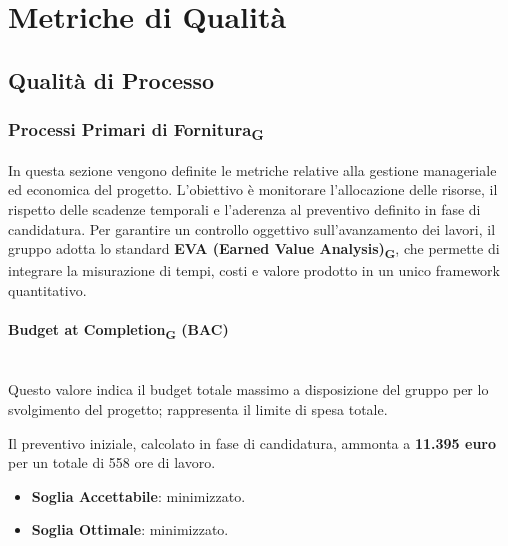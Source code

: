 \documentclass[11pt,a4paper]{article}
\begin{document}
\newpage

\section{Metriche di Qualità}
\subsection{Qualità di Processo}

\subsubsection{Processi Primari di Fornitura\textsubscript{G}}
In questa sezione vengono definite le metriche relative alla gestione manageriale ed economica del progetto. L'obiettivo è monitorare l'allocazione delle risorse, il rispetto delle scadenze temporali e l'aderenza al preventivo definito in fase di candidatura.
Per garantire un controllo oggettivo sull'avanzamento dei lavori, il gruppo adotta lo standard \textbf{EVA (Earned Value Analysis)\textsubscript{G}}, che permette di integrare la misurazione di tempi, costi e valore prodotto in un unico framework quantitativo.

\paragraph{Budget at Completion\textsubscript{G} (BAC)} \hfill \\
Questo valore indica il budget totale massimo a disposizione del gruppo per lo svolgimento del progetto; rappresenta il limite di spesa totale.

Il preventivo iniziale, calcolato in fase di candidatura, ammonta a \textbf{11.395 euro} per un totale di 558 ore di lavoro.
\begin{itemize}
    \item \textbf{Soglia Accettabile}: minimizzato.
    \item \textbf{Soglia Ottimale}: minimizzato.
\end{itemize}
\end{document}
